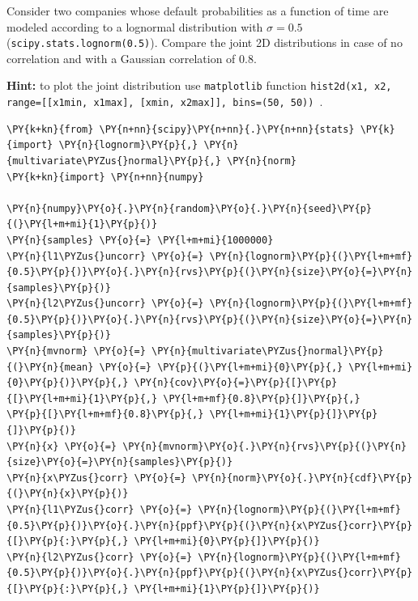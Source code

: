 \begin{Exercise}[title={(Copula)}]
Consider two companies whose default probabilities as a function of time are modeled according to a lognormal distribution with $\sigma =0.5$ (\texttt{scipy.stats.lognorm(0.5)}). Compare the joint 2D distributions in case of no correlation and with a Gaussian correlation of 0.8.

\textbf{Hint:} to plot the joint distribution use \texttt{matplotlib} function \texttt{hist2d(x1, x2, range=[[x1min, x1max], [xmin, x2max]], bins=(50, 50)) }.
\end{Exercise}

\begin{Answer}
\begin{tcolorbox}[size=fbox, boxrule=1pt, colback=cellbackground, colframe=cellborder]
\begin{Verbatim}[commandchars=\\\{\}]
\PY{k+kn}{from} \PY{n+nn}{scipy}\PY{n+nn}{.}\PY{n+nn}{stats} \PY{k}{import} \PY{n}{lognorm}\PY{p}{,} \PY{n}{multivariate\PYZus{}normal}\PY{p}{,} \PY{n}{norm}
\PY{k+kn}{import} \PY{n+nn}{numpy}
		
\PY{n}{numpy}\PY{o}{.}\PY{n}{random}\PY{o}{.}\PY{n}{seed}\PY{p}{(}\PY{l+m+mi}{1}\PY{p}{)}
\PY{n}{samples} \PY{o}{=} \PY{l+m+mi}{1000000}
\PY{n}{l1\PYZus{}uncorr} \PY{o}{=} \PY{n}{lognorm}\PY{p}{(}\PY{l+m+mf}{0.5}\PY{p}{)}\PY{o}{.}\PY{n}{rvs}\PY{p}{(}\PY{n}{size}\PY{o}{=}\PY{n}{samples}\PY{p}{)}
\PY{n}{l2\PYZus{}uncorr} \PY{o}{=} \PY{n}{lognorm}\PY{p}{(}\PY{l+m+mf}{0.5}\PY{p}{)}\PY{o}{.}\PY{n}{rvs}\PY{p}{(}\PY{n}{size}\PY{o}{=}\PY{n}{samples}\PY{p}{)}
\PY{n}{mvnorm} \PY{o}{=} \PY{n}{multivariate\PYZus{}normal}\PY{p}{(}\PY{n}{mean} \PY{o}{=} \PY{p}{(}\PY{l+m+mi}{0}\PY{p}{,} \PY{l+m+mi}{0}\PY{p}{)}\PY{p}{,} \PY{n}{cov}\PY{o}{=}\PY{p}{[}\PY{p}{[}\PY{l+m+mi}{1}\PY{p}{,} \PY{l+m+mf}{0.8}\PY{p}{]}\PY{p}{,}
\PY{p}{[}\PY{l+m+mf}{0.8}\PY{p}{,} \PY{l+m+mi}{1}\PY{p}{]}\PY{p}{]}\PY{p}{)}
\PY{n}{x} \PY{o}{=} \PY{n}{mvnorm}\PY{o}{.}\PY{n}{rvs}\PY{p}{(}\PY{n}{size}\PY{o}{=}\PY{n}{samples}\PY{p}{)}
\PY{n}{x\PYZus{}corr} \PY{o}{=} \PY{n}{norm}\PY{o}{.}\PY{n}{cdf}\PY{p}{(}\PY{n}{x}\PY{p}{)}
\PY{n}{l1\PYZus{}corr} \PY{o}{=} \PY{n}{lognorm}\PY{p}{(}\PY{l+m+mf}{0.5}\PY{p}{)}\PY{o}{.}\PY{n}{ppf}\PY{p}{(}\PY{n}{x\PYZus{}corr}\PY{p}{[}\PY{p}{:}\PY{p}{,} \PY{l+m+mi}{0}\PY{p}{]}\PY{p}{)}
\PY{n}{l2\PYZus{}corr} \PY{o}{=} \PY{n}{lognorm}\PY{p}{(}\PY{l+m+mf}{0.5}\PY{p}{)}\PY{o}{.}\PY{n}{ppf}\PY{p}{(}\PY{n}{x\PYZus{}corr}\PY{p}{[}\PY{p}{:}\PY{p}{,} \PY{l+m+mi}{1}\PY{p}{]}\PY{p}{)}
		

\end{Verbatim}
\end{tcolorbox}
\end{Answer}
